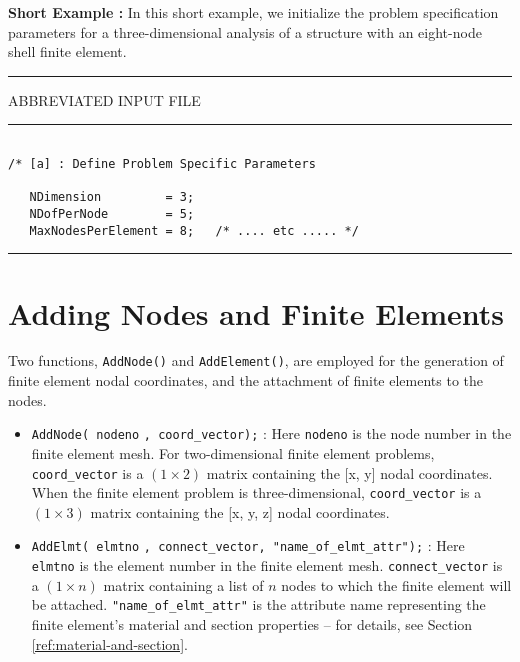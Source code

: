 \vspace{0.15 in}\noindent
{\bf Short Example :} In this short example, we initialize
the problem specification parameters for a three-dimensional
analysis of a structure with an eight-node shell finite element.

\vspace{0.15 in}
\begin{footnotesize}
\noindent
{\rule{2.1 in}{0.035 in} ABBREVIATED INPUT FILE \rule{2.1 in}{0.035 in} }
\begin{verbatim}

/* [a] : Define Problem Specific Parameters

   NDimension         = 3;
   NDofPerNode        = 5;
   MaxNodesPerElement = 8;   /* .... etc ..... */
\end{verbatim}
\rule{6.25 in}{0.035 in}
\end{footnotesize}

\section{Adding Nodes and Finite Elements}

\vspace{0.15 in}
\noindent\hspace{0.5 in}
Two functions, {\tt AddNode()} and {\tt AddElement()}, are employed
for the generation of finite element nodal coordinates,
and the attachment of finite elements to the nodes.

\begin{itemize}
\item{}
{\tt AddNode( nodeno} {\tt , coord\_vector);} :
Here {\tt nodeno} is the node number in the finite element mesh.
For two-dimensional finite element problems,
{\tt coord\_vector} is a $(1 \times 2)$ matrix
containing the [x, y] nodal coordinates.
When the finite element problem is three-dimensional,
{\tt coord\_vector} is a $(1 \times 3)$ matrix
containing the [x, y, z] nodal coordinates.

\item{}
{\tt AddElmt( elmtno} {\tt , connect\_vector, "name\_of\_elmt\_attr");} :
Here {\tt elmtno} is the element number in the finite element mesh.
{\tt connect\_vector} is a $(1 \times n)$ matrix
containing a list of $n$ nodes to which the finite element will be attached.
{\tt "name\_of\_elmt\_attr"} is the attribute name representing the
finite element's material and section properties --
for details, see Section \ref{ref:material-and-section}.
\end{itemize}

